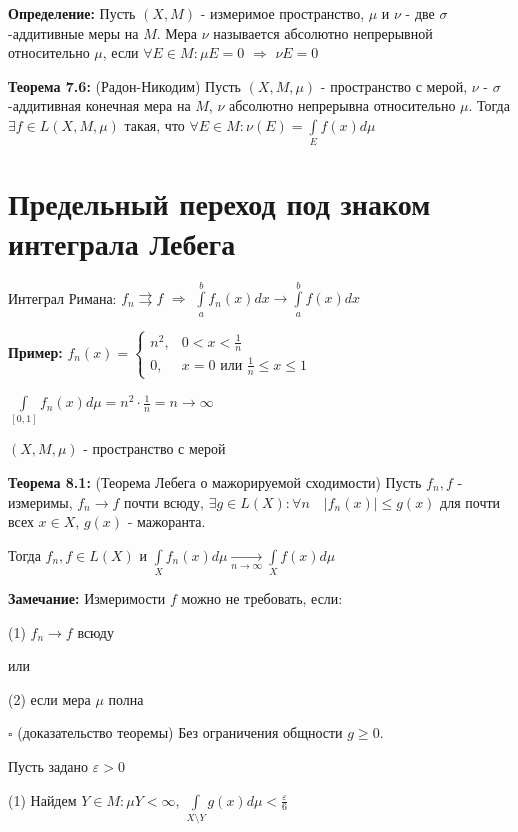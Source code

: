 \documentclass[a4paper]{report}
\begin{document}
\noindent\textbf{Определение:} Пусть $(X,M)$ - измеримое пространство, $\mu$ и $\nu$ - две $\sigma$-аддитивные меры на $M$. Мера $\nu$ называется абсолютно непрерывной относительно $\mu$, если $\forall E\in M\colon\mu E=0$ $\Rightarrow$ $\nu E=0$
\bigskip

\noindent\textbf{Теорема 7.6:} (Радон-Никодим) Пусть $(X,M,\mu)$ - пространство с мерой, $\nu$ - $\sigma$-аддитивная конечная мера на $M$, $\nu$ абсолютно непрерывна относительно $\mu$. Тогда $\exists f\in L(X,M,\mu)$ такая, что $\forall E\in M\colon\nu(E)=\displaystyle\int\limits_E f(x)d\mu$






\chapter{Предельный переход под знаком интеграла Лебега}

Интеграл Римана: $f_n\rightrightarrows f$ $\Rightarrow$ $\displaystyle\int\limits_a^b f_n(x)dx\to\displaystyle\int\limits_a^b f(x)dx$

\noindent\textbf{Пример:} $f_n(x)=\begin{cases}n^2,&0<x<\frac1n\\0,&x=0\text{ или }\frac1n\le x\le 1\end{cases}$

$\displaystyle\int\limits_{[0,1]}f_n(x)d\mu=n^2\cdot\frac1n=n\to\infty$
\bigskip

$(X,M,\mu)$ - пространство с мерой

\noindent\textbf{Теорема 8.1:} (Теорема Лебега о мажорируемой сходимости) Пусть $f_n,f$ - измеримы, $f_n\to f$ почти всюду, $\exists g\in L(X)\colon\forall n\quad
|f_n(x)|\le g(x)$ для почти всех $x\in X$, $g(x)$ - мажоранта. 

Тогда $f_n,f\in L(X)$ и $\displaystyle\int\limits_X f_n(x)d\mu\xrightarrow[n\to\infty]{}\displaystyle\int\limits_X f(x)d\mu$
\bigskip

\noindent\textbf{Замечание:} Измеримости $f$ можно не требовать, если:

(1) $f_n\to f$ всюду

или

(2) если мера $\mu$ полна

\noindent $\square$ (доказательство теоремы) Без ограничения общности $g\ge0$. 

Пусть задано $\varepsilon>0$

(1) Найдем $Y\in M\colon\mu Y<\infty$, $\displaystyle\int\limits_{X\setminus Y} g(x)d\mu<\frac\varepsilon6$
\end{document}
